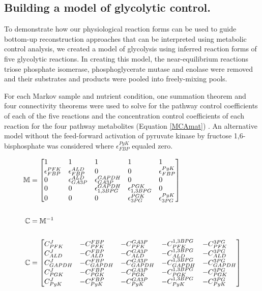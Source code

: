 \subsection{Building a model of glycolytic control.}

To demonstrate how our physiological reaction forms can be used to guide bottom-up reconstruction approaches that can be interpreted using metabolic control analysis, we created a model of glycolysis using inferred reaction forms of five glycolytic reactions.  In creating this model, the near-equilibrium reactions triose phosphate isomerase, phosphoglycerate mutase and enolase were removed and their substrates and products were pooled into freely-mixing pools.

For each Markov sample and nutrient condition, one summation theorem and four connectivity theorems were used to solve for the pathway control coefficients of each of the five reactions and the concentration control coefficients of each reaction for the four pathway metabolites (Equation \ref{MCAmat}) \cite{main-Westerhoff:1987jo}.  An alternative model without the feed-forward activation of pyruvate kinase by fructose 1,6-bisphosphate was considered where $\epsilon^{PyK}_{FBP}$ equaled zero.  

\begin{align}
\mathbb{M} &= \begin{bmatrix*}[l]
  1 & 1 & 1 & 1 & 1 \\
  \epsilon^{PFK}_{FBP} & \epsilon^{ALD}_{FBP} & 0 & 0 & \epsilon^{PyK}_{FBP} \\
  0 & \epsilon^{ALD}_{GA3P} & \epsilon^{GAPDH}_{GA3P} & 0 & 0 \\
  0 & 0 & \epsilon^{GAPDH}_{1,3BPG} & \epsilon^{PGK}_{1,3BPG} & 0 \\
  0 & 0 & 0 & \epsilon^{PGK}_{3PG} & \epsilon^{PyK}_{3PG} \\
 \end{bmatrix*}\notag\\\notag\\
  \mathbb{C} &= \mathbb{M}^{-1}\notag\\\notag\\
 \mathbb{C} &= \begin{bmatrix*}[l]
  C^{J}_{PFK} & -C^{FBP}_{PFK} & -C^{GA3P}_{PFK} & -C^{1,3BPG}_{PFK} & -C^{3PG}_{PFK} \\
  C^{J}_{ALD} & -C^{FBP}_{ALD} & -C^{GA3P}_{ALD} & -C^{1,3BPG}_{ALD} & -C^{3PG}_{ALD} \\
  C^{J}_{GAPDH} & -C^{FBP}_{GAPDH} & -C^{GA3P}_{GAPDH} & -C^{1,3BPG}_{GAPDH} & -C^{3PG}_{GAPDH} \\
  C^{J}_{PGK} & -C^{FBP}_{PGK} & -C^{GA3P}_{PGK} & -C^{1,3BPG}_{PGK} & -C^{3PG}_{PGK} \\
  C^{J}_{PyK} & -C^{FBP}_{PyK} & -C^{GA3P}_{PyK} & -C^{1,3BPG}_{PyK} & -C^{3PG}_{PyK}
 \end{bmatrix*}\label{MCAmat}
\end{align}


